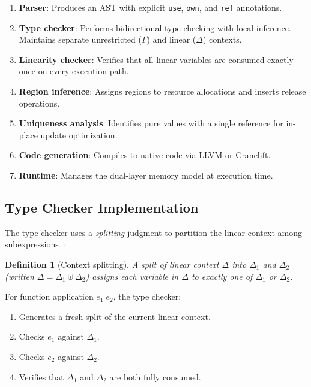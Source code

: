 \documentclass[11pt]{article}
\newtheorem{definition}[theorem]{Definition}
\begin{document}
\begin{enumerate}
  \item \textbf{Parser}: Produces an AST with explicit \texttt{use},
        \texttt{own}, and \texttt{ref} annotations.
  \item \textbf{Type checker}: Performs bidirectional type checking
        with local inference.  Maintains separate unrestricted
        ($\Gamma$) and linear ($\Delta$) contexts.
  \item \textbf{Linearity checker}: Verifies that all linear variables
        are consumed exactly once on every execution path.
  \item \textbf{Region inference}: Assigns regions to resource
        allocations and inserts release operations.
  \item \textbf{Uniqueness analysis}: Identifies pure values with a
        single reference for in-place update optimization.
  \item \textbf{Code generation}: Compiles to native code via LLVM or
        Cranelift.
  \item \textbf{Runtime}: Manages the dual-layer memory model at
        execution time.
\end{enumerate}

\subsection{Type Checker Implementation}\label{sec:impl-tc}

The type checker uses a \emph{splitting} judgment to partition the
linear context among subexpressions~\cite{walker2005substructural}:

\begin{definition}[Context splitting]\label{def:splitting}
A \emph{split} of linear context $\Delta$ into $\Delta_1$ and
$\Delta_2$ (written $\Delta = \Delta_1 \uplus \Delta_2$) assigns
each variable in $\Delta$ to exactly one of $\Delta_1$ or $\Delta_2$.
\end{definition}

For function application $e_1\; e_2$, the type checker:
\begin{enumerate}
  \item Generates a fresh split of the current linear context.
  \item Checks $e_1$ against $\Delta_1$.
  \item Checks $e_2$ against $\Delta_2$.
  \item Verifies that $\Delta_1$ and $\Delta_2$ are both fully consumed.
\end{enumerate}
\end{document}

